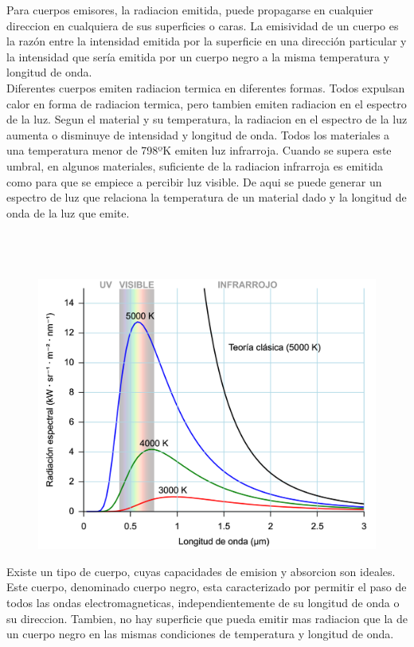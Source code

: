 \documentclass[a4paper,12pt]{report}
\begin{document}
  Para cuerpos emisores, la radiacion emitida, puede propagarse en cualquier direccion en cualquiera
  de sus superficies o caras. La emisividad de un cuerpo es la razón entre la intensidad emitida por la
  superficie en una dirección particular y la intensidad que sería emitida por un cuerpo negro a la misma temperatura y
  longitud de onda.\\

  Diferentes cuerpos emiten radiacion termica en diferentes formas. Todos expulsan calor en forma de radiacion termica,
  pero tambien emiten radiacion en el espectro de la luz. Segun el material y su temperatura, la radiacion en el
  espectro de la luz aumenta o disminuye de intensidad y longitud de onda. Todos los materiales a una
  temperatura menor de 798ºK emiten luz infrarroja. Cuando se supera este umbral, en algunos materiales, suficiente de
  la radiacion infrarroja es emitida como para que se empiece a percibir luz visible. De aqui se puede generar un
  espectro de luz que relaciona la temperatura de un material dado y la longitud de onda de la luz que emite.\\\\\\\\
  \begin{figure}[h!]
    \centering
    \includegraphics[width=\linewidth]{images/img1.png}
  \end{figure}

  Existe un tipo de cuerpo, cuyas capacidades de emision y absorcion son ideales. Este cuerpo, denominado cuerpo negro,
  esta caracterizado por permitir el paso de todos las ondas electromagneticas, independientemente de su longitud de
  onda o su direccion. Tambien, no hay superficie que pueda emitir mas radiacion que la de un cuerpo negro en las
  mismas condiciones de temperatura y longitud de onda.\\
\end{document}
